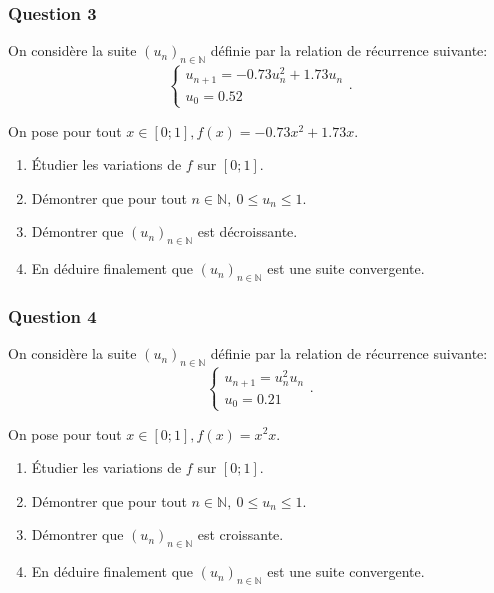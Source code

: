 \documentclass[15pt, mathserif]{beamer}
\begin{document}
\begin{frame} 
	\frametitle{Question 3}
On considère la suite $(u_n)_{n\in\mathbb{N}}$ définie par la relation de récurrence suivante:\[\begin{cases} u_{n+1} = -0.73u_n^2+1.73u_n\\[1em] u_0 = 0.52\end{cases}.\]

On pose pour tout $x \in [0;1], f(x) = -0.73x^2+1.73x$.

\begin{enumerate}
	\item Étudier les variations de $f$ sur $[0;1]$.
	\item Démontrer que pour tout $n \in \mathbb{N}, ~0 \leq u_n \leq 1$.
	\item Démontrer que $(u_n)_{n\in\mathbb{N}}$ est décroissante.
	\item En déduire finalement que $(u_n)_{n\in\mathbb{N}}$ est une suite convergente.
\end{enumerate}
\end{frame}


\begin{frame} 
	\frametitle{Question 4}
On considère la suite $(u_n)_{n\in\mathbb{N}}$ définie par la relation de récurrence suivante:\[\begin{cases} u_{n+1} = u_n^2u_n\\[1em] u_0 = 0.21\end{cases}.\]

On pose pour tout $x \in [0;1], f(x) = x^2x$.

\begin{enumerate}
	\item Étudier les variations de $f$ sur $[0;1]$.
	\item Démontrer que pour tout $n \in \mathbb{N}, ~0 \leq u_n \leq 1$.
	\item Démontrer que $(u_n)_{n\in\mathbb{N}}$ est croissante.
	\item En déduire finalement que $(u_n)_{n\in\mathbb{N}}$ est une suite convergente.
\end{enumerate}
\end{frame}
\end{document}
